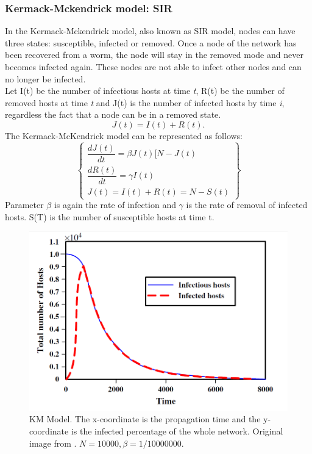 \subsubsection{Kermack-Mckendrick model: SIR}
In the Kermack-Mckendrick model, also known as SIR model, nodes can have three states: susceptible, infected or removed. Once a node of the network has been recovered from a worm, the node will stay in the removed mode and never becomes infected again. These nodes are not able to infect other nodes and can no longer be infected. \\
Let I(t) be the number of infectious hosts at time \textit{t}, R(t) be the number of removed hosts at time \textit{t} and J(t) is the number of infected hosts by time \textit{i}, regardless the fact that a node can be in a removed state.
\begin{equation}
J(t) = I(t) + R(t).
\end{equation} 
The Kermack-McKendrick model can be represented as follows:
\begin{equation}
\begin{Bmatrix} \dfrac{d J(t)}{dt} = \beta J(t) \big[N- J(t) \\
\dfrac{d R(t)}{dt} = \gamma I(t) \\
J(t) = I(t) + R(t) = N - S(t)
 \end{Bmatrix}
\end{equation}
Parameter $\beta$ is again the rate of infection and $\gamma$ is the rate of removal of infected hosts. S(T) is the number of susceptible hosts at time t.
\begin{figure}[hbtp]
\centering
\includegraphics[scale=0.5]{Images/KMmodel.png}
\caption{KM Model. The x-coordinate is the propagation time and the y-coordinate is the infected percentage of the whole network. Original image from \cite{OnWorms2005survey}. $N=10000, \beta = 1/10000000$.}
\label{KMmodel}
\end{figure}

